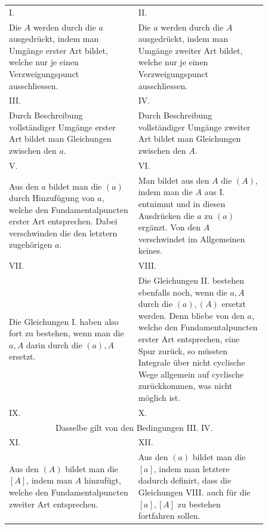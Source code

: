 \documentclass[10pt]{article}
\begin{document}
\begin{center}
\scriptsize
\begin{tabular}{p{0.43\linewidth}|p{0.43\linewidth}}
\centering I. & \centering II.\tabularnewline
Die \(A\) werden durch die \(a\) ausgedrückt, indem man Umgänge erster Art bildet, welche nur je einen Verzweigungspunct ausschliessen. &
Die \(a\) werden durch die \(A\) ausgedrückt, indem man Umgänge zweiter Art bildet, welche nur je einen Verzweigungspunct ausschliessen.\tabularnewline[0.6em]
\centering III. & \centering IV.\tabularnewline
Durch Beschreibung vollständiger Umgänge erster Art bildet man Gleichungen zwischen den \(a\). &
Durch Beschreibung vollständiger Umgänge zweiter Art bildet man Gleichungen zwischen den \(A\).\tabularnewline[0.6em]
\centering V. & \centering VI.\tabularnewline
Aus den \(a\) bildet man die \((a)\) durch Hinzufügung von \(a\), welche den Fundamentalpuncten erster Art entsprechen. Dabei verschwinden die den letztern zugehörigen \(a\). &
Man bildet aus den \(A\) die \((A)\), indem man die \(A\) aus I. entnimmt und in diesen Ausdrücken die \(a\) zu \((a)\) ergänzt. Von den \(A\) verschwindet im Allgemeinen keines.\tabularnewline[0.6em]
\centering VII. & \centering VIII.\tabularnewline
Die Gleichungen I. haben also fort zu bestehen, wenn man die \(a,A\) darin durch die \((a),A\) ersetzt. &
Die Gleichungen II. bestehen ebenfalls noch, wenn die \(a,A\) durch die \((a),(A)\) ersetzt werden. Denn bliebe von den \(a\), welche den Fundamentalpuncten erster Art entsprechen, eine Spur zurück, so müssten Integrale über nicht cyclische Wege allgemein auf cyclische zurückkommen, was nicht möglich ist.\tabularnewline[0.6em]
\centering IX. & \centering X.\tabularnewline
\multicolumn{2}{c}{Dasselbe gilt von den Bedingungen III. IV.}\tabularnewline[0.6em]
\centering XI. & \centering XII.\tabularnewline
Aus den \((A)\) bildet man die \([A]\), indem man \(A\) hinzufügt, welche den Fundamentalpuncten zweiter Art entsprechen. &
Aus den \((a)\) bildet man die \([a]\), indem man letztere dadurch definirt, dass die Gleichungen VIII. auch für die \([a],[A]\) zu bestehen fortfahren sollen.
\end{tabular}
\end{center}
\end{document}
